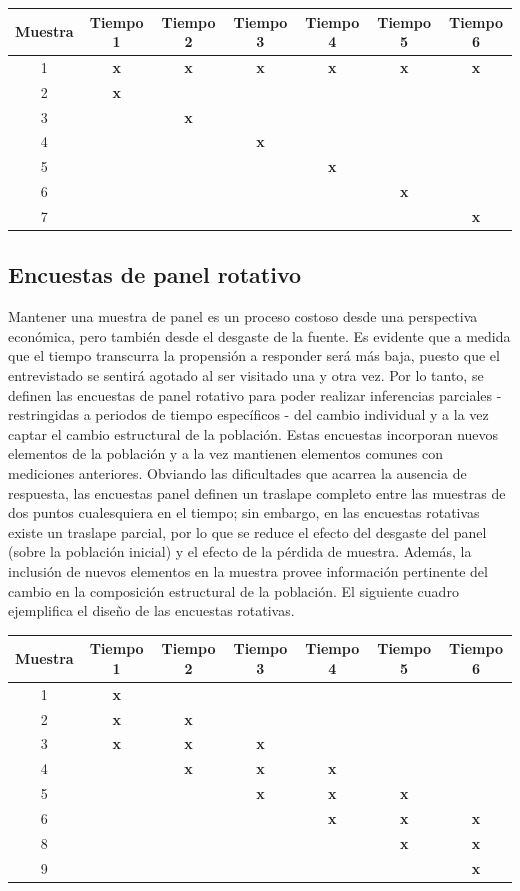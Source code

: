 \begin{longtable}[]{@{}ccccccc@{}}
\toprule
Muestra & Tiempo 1 & Tiempo 2 & Tiempo 3 & Tiempo 4 & Tiempo 5 & Tiempo 6\tabularnewline
\midrule
\endhead
1 & \textbf{x} & \textbf{x} & \textbf{x} & \textbf{x} & \textbf{x} & \textbf{x}\tabularnewline
2 & \textbf{x} & & & & &\tabularnewline
3 & & \textbf{x} & & & &\tabularnewline
4 & & & \textbf{x} & & &\tabularnewline
5 & & & & \textbf{x} & &\tabularnewline
6 & & & & & \textbf{x} &\tabularnewline
7 & & & & & & \textbf{x}\tabularnewline
\bottomrule
\end{longtable}

\hypertarget{encuestas-de-panel-rotativo}{%
\subsection{Encuestas de panel rotativo}\label{encuestas-de-panel-rotativo}}

Mantener una muestra de panel es un proceso costoso desde una perspectiva económica, pero también desde el desgaste de la fuente. Es evidente que a medida que el tiempo transcurra la propensión a responder será más baja, puesto que el entrevistado se sentirá agotado al ser visitado una y otra vez. Por lo tanto, se definen las encuestas de panel rotativo para poder realizar inferencias parciales - restringidas a periodos de tiempo específicos - del cambio individual y a la vez captar el cambio estructural de la población. Estas encuestas incorporan nuevos elementos de la población y a la vez mantienen elementos comunes con mediciones anteriores. Obviando las dificultades que acarrea la ausencia de respuesta, las encuestas panel definen un traslape completo entre las muestras de dos puntos cualesquiera en el tiempo; sin embargo, en las encuestas rotativas existe un traslape parcial, por lo que se reduce el efecto del desgaste del panel (sobre la población inicial) y el efecto de la pérdida de muestra. Además, la inclusión de nuevos elementos en la muestra provee información pertinente del cambio en la composición estructural de la población. El siguiente cuadro ejemplifica el diseño de las encuestas rotativas.

\begin{longtable}[]{@{}ccccccc@{}}
\toprule
Muestra & Tiempo 1 & Tiempo 2 & Tiempo 3 & Tiempo 4 & Tiempo 5 & Tiempo 6\tabularnewline
\midrule
\endhead
1 & \textbf{x} & & & & &\tabularnewline
2 & \textbf{x} & \textbf{x} & & & &\tabularnewline
3 & \textbf{x} & \textbf{x} & \textbf{x} & & &\tabularnewline
4 & & \textbf{x} & \textbf{x} & \textbf{x} & &\tabularnewline
5 & & & \textbf{x} & \textbf{x} & \textbf{x} &\tabularnewline
6 & & & & \textbf{x} & \textbf{x} & \textbf{x}\tabularnewline
8 & & & & & \textbf{x} & \textbf{x}\tabularnewline
9 & & & & & & \textbf{x}\tabularnewline
\bottomrule
\end{longtable}

